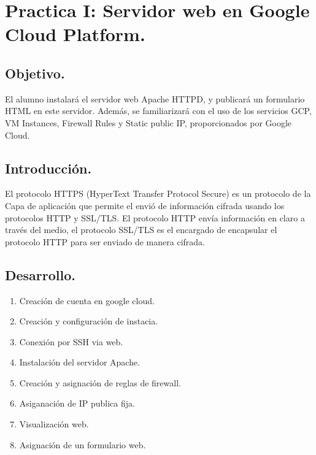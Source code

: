 \documentclass[12pt]{article}
\begin{document}

{\color{red} \section*{\textbf{Practica I: Servidor web en Google Cloud Platform.}}}
\vspace{1em}

{\color{blue} \subsection*{\textbf{Objetivo.}}}
\vspace{1em}
El alumno instalará el servidor web Apache HTTPD, y publicará un formulario HTML en este servidor. Además, se familiarizará con el uso de los servicios GCP, VM Instances, Firewall Rules y Static public IP, proporcionados por Google Cloud.
\vspace{2em}

{\color{blue} \subsection*{\textbf{Introducción.}}}
\vspace{1em}
El protocolo HTTPS (HyperText Transfer Protocol Secure) es un protocolo de la Capa de aplicación que permite el envió de información cifrada usando los protocolos HTTP y SSL/TLS. El protocolo HTTP envía información en claro a través del medio, el protocolo SSL/TLS es el encargado de encapsular el protocolo HTTP para ser enviado de manera cifrada.
\vspace{2em}


{\color{blue} \subsection*{\textbf{Desarrollo.}}}
\vspace{1em}
\begin{enumerate}
    \item Creación de cuenta en google cloud.
    \item Creación y configuración de instacia.
    \item Conexión por SSH via web.
    \item Instalación del servidor Apache.
    \item Creación y asignación de reglas de firewall.
    \item Asiganación de IP publica fija.
    \item Visualización web.
    \item Asignación de un formulario web.
\end{enumerate}\\
\end{document}
